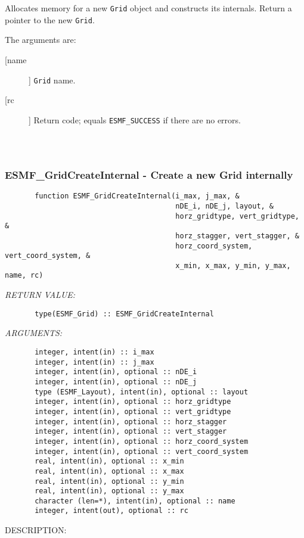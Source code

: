        Allocates memory for a new {\tt Grid} object and constructs its
       internals.  Return a pointer to the new {\tt Grid}.
  
       The arguments are:
       \begin{description}
       \item[[name]]
            {\tt Grid} name.
       \item[[rc]]
            Return code; equals {\tt ESMF\_SUCCESS} if there are no errors.
     \end{description}
  
\begin{verbatim} \end{verbatim}
 
 
\mbox{}\hrulefill\ 
 
\subsubsection{ESMF\_GridCreateInternal - Create a new Grid internally}


\begin{verbatim}       function ESMF_GridCreateInternal(i_max, j_max, &
                                        nDE_i, nDE_j, layout, &
                                        horz_gridtype, vert_gridtype, &
                                        horz_stagger, vert_stagger, &
                                        horz_coord_system, vert_coord_system, &
                                        x_min, x_max, y_min, y_max, name, rc)\end{verbatim}{\em RETURN VALUE:}
\begin{verbatim}       type(ESMF_Grid) :: ESMF_GridCreateInternal\end{verbatim}{\em ARGUMENTS:}
\begin{verbatim}       integer, intent(in) :: i_max
       integer, intent(in) :: j_max
       integer, intent(in), optional :: nDE_i
       integer, intent(in), optional :: nDE_j
       type (ESMF_Layout), intent(in), optional :: layout
       integer, intent(in), optional :: horz_gridtype
       integer, intent(in), optional :: vert_gridtype
       integer, intent(in), optional :: horz_stagger
       integer, intent(in), optional :: vert_stagger
       integer, intent(in), optional :: horz_coord_system
       integer, intent(in), optional :: vert_coord_system
       real, intent(in), optional :: x_min
       real, intent(in), optional :: x_max
       real, intent(in), optional :: y_min
       real, intent(in), optional :: y_max
       character (len=*), intent(in), optional :: name
       integer, intent(out), optional :: rc\end{verbatim}
{\sf DESCRIPTION:\\ }


